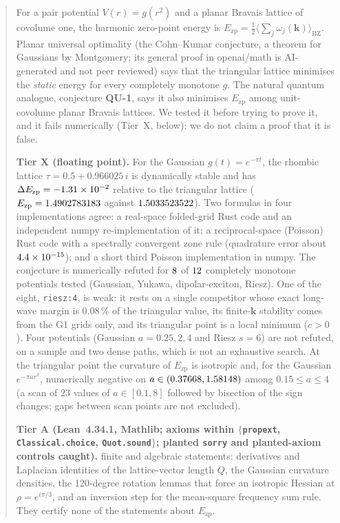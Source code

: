 \documentclass[10pt]{article}
\newcommand{\lean}[1]{\texttt{#1}}
\newcommand{\Ezp}{E_{\mathrm{zp}}}
\begin{document}
\begin{abstract}
For a pair potential $V(r)=g(r^2)$ and a planar Bravais lattice of covolume one, the harmonic zero-point energy is
$\Ezp=\tfrac12\langle\sum_j\omega_j(\mathbf k)\rangle_{\mathrm{BZ}}$. Planar universal optimality (the Cohn--Kumar conjecture, a theorem for Gaussians by Montgomery; its general proof in openai/math is AI-generated and not peer reviewed) says that the
triangular lattice minimises the \emph{static} energy for every completely monotone $g$. The natural quantum analogue,
conjecture \textbf{QU-1}, says it also minimises $\Ezp$ among unit-covolume planar Bravais lattices. We tested it before
trying to prove it, and it fails numerically (Tier~X, below): we do not claim a proof that it is false.

\textbf{Tier X (floating point).} For the Gaussian $g(t)=e^{-\pi t}$, the rhombic lattice $\tau=0.5+0.966025\,i$ is
dynamically stable and has $\Delta\Ezp=\ZPdEHeadShort$ relative to the triangular lattice ($\Ezp=\ZPEzpHead$ against
$\ZPEzpTri$). Two formulas in four implementations agree: a real-space folded-grid Rust code and an independent numpy
re-implementation of it; a reciprocal-space (Poisson) Rust code with a spectrally convergent zone rule (quadrature error about
$\ZPQuadErr$); and a short third Poisson implementation in numpy. The conjecture is numerically refuted for $\ZPNRefuted$ of $\ZPNTested$ completely monotone
potentials tested (Gaussian, Yukawa, dipolar-exciton, Riesz). One of the eight, \texttt{riesz:4}, is weak: it rests on a single competitor whose exact long-wave margin is
0.08\,\% of the triangular value, its finite-$\mathbf k$ stability comes from the G1 grids only, and its triangular point is a local minimum ($c>0$).
Four potentials (Gaussian $a=0.25,2,4$ and Riesz $s=6$) are not refuted, on a sample
and two dense paths, which is not an exhaustive search. At the triangular point the curvature of $\Ezp$ is isotropic and, for the
Gaussian $e^{-\pi a r^2}$, numerically negative on $a\in(\ZPRootOne,\ZPRootTwo)$ among $0.15\le a\le4$ (a scan of 23 values of $a\in[0.1,8]$ followed by bisection of the sign changes; gaps between scan points are not excluded).

\textbf{Tier A (Lean~4.34.1, Mathlib; axioms within $\{$\lean{propext}, \lean{Classical.choice}, \lean{Quot.sound}$\}$;
planted \lean{sorry} and planted-axiom controls caught).} \ZPLeanNThm{} finite and algebraic statements: derivatives and
Laplacian identities of the lattice-vector length $Q$, the Gaussian curvature densities, the 120-degree rotation lemmas
that force an isotropic Hessian at $\rho=e^{i\pi/3}$, and an inversion step for the mean-square frequency sum rule. They
certify none of the statements about $\Ezp$.


\end{abstract}
\end{document}
